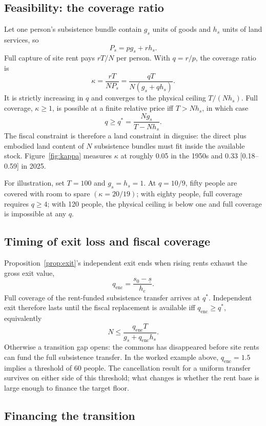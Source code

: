 \documentclass[12pt]{article}
\theoremstyle{plain}
\begin{document}
\subsection{Feasibility: the coverage ratio}\label{app:coverage}

Let one person's subsistence bundle contain $g_s$ units of goods and $h_s$ units of land services, so
\[
P_s=pg_s+rh_s.
\]
Full capture of site rent pays $rT/N$ per person. With $q=r/p$, the coverage ratio is
\[
\kappa=\frac{rT}{NP_s}
      =\frac{qT}{N(g_s+qh_s)}.
\]
It is strictly increasing in $q$ and converges to the physical ceiling $T/(Nh_s)$. Full coverage, $\kappa\ge1$, is possible at a finite relative price iff $T>Nh_s$, in which case
\[
q\ge q^*=\frac{Ng_s}{T-Nh_s}.
\]
The fiscal constraint is therefore a land constraint in disguise: the direct plus embodied land content of $N$ subsistence bundles must fit inside the available stock. Figure~\ref{fig:kappa} measures $\kappa$ at roughly 0.05 in the 1950s and 0.33 [0.18--0.59] in 2025.

For illustration, set $T=100$ and $g_s=h_s=1$. At $q=10/9$, fifty people are covered with room to spare $(\kappa=20/19)$; with eighty people, full coverage requires $q\ge4$; with 120 people, the physical ceiling is below one and full coverage is impossible at any $q$.

\subsection{Timing of exit loss and fiscal coverage}\label{app:race}

Proposition~\ref{prop:exit}'s independent exit ends when rising rents exhaust the gross exit value,
\[
q_{\mathrm{enc}}=\frac{s_0-\underline{s}}{h_e}.
\]
Full coverage of the rent-funded subsistence transfer arrives at $q^*$. Independent exit therefore lasts until the fiscal replacement is available iff $q_{\mathrm{enc}}\ge q^*$, equivalently
\[
N\le \frac{q_{\mathrm{enc}}T}{g_s+q_{\mathrm{enc}}h_s}.
\]
Otherwise a transition gap opens: the commons has disappeared before site rents can fund the full subsistence transfer. In the worked example above, $q_{\mathrm{enc}}=1.5$ implies a threshold of 60 people. The cancellation result for a uniform transfer survives on either side of this threshold; what changes is whether the rent base is large enough to finance the target floor.

\subsection{Financing the transition}\label{app:mix}
\end{document}
